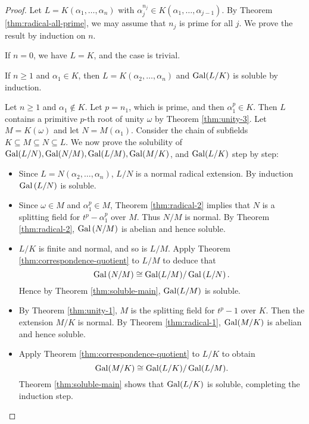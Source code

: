 \begin{proof}
Let $L=K\left(\alpha_1, \ldots, \alpha_n\right)$ with $\alpha_j^{n_j} \in K\left(\alpha_1, \ldots, \alpha_{j-1}\right)$. By Theorem \ref{thm:radical-all-prime}, we may assume that $n_j$ is prime for all $j$. We prove the result by induction on $n$. 

If $n = 0$, we have $L = K$, and the case is trivial.

If $n \ge 1$ and $\alpha_1 \in K$, then $L=K\left(\alpha_2, \ldots, \alpha_n\right)$ and $\operatorname{Gal}(L / K)$ is soluble by induction.

Let $n \ge 1$ and $\alpha_1 \notin K$. Let $p = n_1$, which is prime, and then $\alpha_1^p \in K$.  Then $L$ contains a primitive $p$-th root of unity $\omega$ by Theorem \ref{thm:unity-3}. Let $M = K(\omega)$ and let $N = M(\alpha_1)$. Consider the chain of subfields $K \subseteq M \subseteq N \subseteq L$. We now prove the solubility of $\operatorname{Gal}(L/N), \operatorname{Gal}(N/M), \operatorname{Gal}(L/M), \operatorname{Gal}(M/K)$, and $\operatorname{Gal}(L/K)$ step by step:

\begin{itemize}
    \item Since $L=N\left(\alpha_2, \ldots, \alpha_n\right)$, $L / N$ is a normal radical extension. By induction $\operatorname{Gal}\left(L / N\right)$ is soluble. 
    \item Since $ \omega \in M$ and $\alpha_1^p \in M$, Theorem \ref{thm:radical-2} implies that $N$ is a splitting field for $t^p-\alpha_1^p$ over $M$. Thus $N / M$ is normal. By Theorem \ref{thm:radical-2}, $\operatorname{Gal}\left(N / M\right)$ is abelian and hence soluble. 
    \item  $L/ K$ is finite and normal, and so is $L / M$. Apply Theorem \ref{thm:correspondence-quotient} to $L / M$ to deduce that
    $$
    \operatorname{Gal}\left( N / M \right) \cong \operatorname{Gal}(L / M) / \operatorname{Gal}\left(L / N\right).
    $$
    Hence by Theorem \ref{thm:soluble-main},  $ \operatorname{Gal}(L / M)$ is soluble.
    \item By Theorem \ref{thm:unity-1}, $M$ is the splitting field for $t^p-1$ over $K$. Then the extension $M / K$ is normal. By Theorem \ref{thm:radical-1}, $\operatorname{Gal}(M / K)$ is abelian and hence soluble.
    \item  Apply Theorem \ref{thm:correspondence-quotient} to $L / K$ to obtain
    $$
    \operatorname{Gal}(M / K) \cong \operatorname{Gal}(L / K) / \operatorname{Gal}(L / M). 
    $$
    Theorem \ref{thm:soluble-main} shows that $\operatorname{Gal}(L / K)$ is soluble, completing the induction step.
\end{itemize}
\end{proof}


